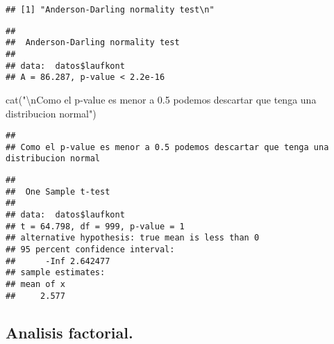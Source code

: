 \documentclass[
]{article}
\newenvironment{Shaded}{\begin{snugshade}}{\end{snugshade}}
\newcommand{\AttributeTok}[1]{\textcolor[rgb]{0.77,0.63,0.00}{#1}}
\newcommand{\FloatTok}[1]{\textcolor[rgb]{0.00,0.00,0.81}{#1}}
\newcommand{\FunctionTok}[1]{\textcolor[rgb]{0.00,0.00,0.00}{#1}}
\newcommand{\NormalTok}[1]{#1}
\newcommand{\SpecialCharTok}[1]{\textcolor[rgb]{0.00,0.00,0.00}{#1}}
\newcommand{\StringTok}[1]{\textcolor[rgb]{0.31,0.60,0.02}{#1}}
\begin{document}
\begin{verbatim}
## [1] "Anderson-Darling normality test\n"
\end{verbatim}

\begin{Shaded}
\end{Shaded}

\begin{verbatim}
## 
##  Anderson-Darling normality test
## 
## data:  datos$laufkont
## A = 86.287, p-value < 2.2e-16
\end{verbatim}

\begin{Shaded}
\begin{Highlighting}[]
  \FunctionTok{cat}\NormalTok{(}\StringTok{"}\SpecialCharTok{\textbackslash{}n}\StringTok{Como el p{-}value es menor a 0.5 podemos descartar que tenga una distribucion normal"}\NormalTok{)}
\end{Highlighting}
\end{Shaded}

\begin{verbatim}
## 
## Como el p-value es menor a 0.5 podemos descartar que tenga una distribucion normal
\end{verbatim}

\begin{Shaded}
\end{Shaded}

\begin{verbatim}
## 
##  One Sample t-test
## 
## data:  datos$laufkont
## t = 64.798, df = 999, p-value = 1
## alternative hypothesis: true mean is less than 0
## 95 percent confidence interval:
##      -Inf 2.642477
## sample estimates:
## mean of x 
##     2.577
\end{verbatim}

\hypertarget{analisis-factorial.}{%
\subsection{Analisis factorial.}\label{analisis-factorial.}}
\end{document}
